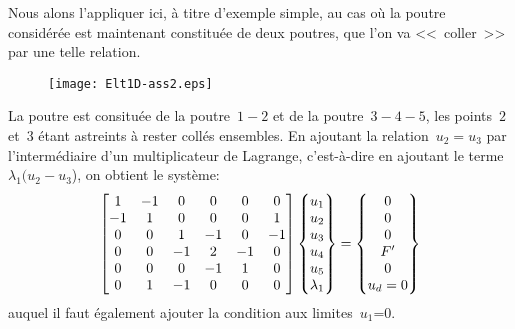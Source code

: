 \medskip
Nous alons l'appliquer ici, à titre d'exemple simple, au cas où la poutre considérée est maintenant constituée de deux poutres, que l'on va <<~coller~>> par une telle relation.
\begin{figure}[ht]
\centering
\texttt{[image: Elt1D-ass2.eps]}
\end{figure}
La poutre est consituée de la poutre~$1-2$ et de la poutre~$3-4-5$, les points~$2$ et~$3$ étant astreints à rester collés ensembles.
\medskipvm
En ajoutant la relation~$u_2=u_3$ par l'intermédiaire d'un multiplicateur de Lagrange, c'est-à-dire en ajoutant le terme~$\lambda_1(u_2-u_3$), on obtient le système:
\begin{equation}
\MM*{1&-1&0&0&0&0 \\ -1&1&0&0&0&1 \\ 0&0&1&-1&0&-1\\ 0&0&-1&2&-1&0\\ 0&0&0&-1&1&0 \\ 0&1&-1&0&0&0}
\VV*{u_1\\u_2\\u_3\\u_4\\ u_5\\ \lambda_1}
=
\VV*{0\\0\\0\\F' \\ 0 \\ u_d=0}
\end{equation}
auquel il faut également ajouter la condition aux limites~$u_1$=0.

